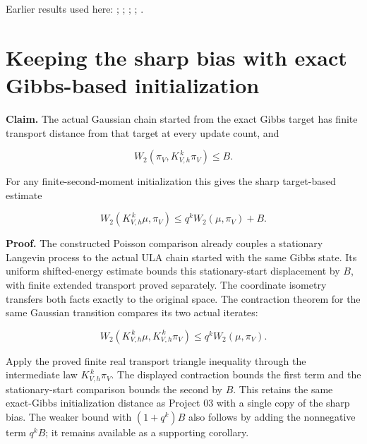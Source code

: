 \documentclass[11pt,a4paper]{article}
\begin{document}
Earlier results used here: \cite[Section~3.17.3]{LangevinLean2026ULASC}; \cite[Section~3.21.2]{LangevinLean2026ULASC}; \cite[Section~3.26.3]{LangevinLean2026ULASC}; \cite[Section~3.36.7]{LangevinLean2026ULASC}; \cite[Section~3.45.6]{LangevinLean2026ULASC}.

\section{\texorpdfstring{Keeping the sharp bias with exact Gibbs-based initialization}{Keeping the sharp bias with exact Gibbs-based initialization}}


\textbf{Claim.} The actual Gaussian chain started from the exact Gibbs target has finite transport distance from that target at every update count, and

\[W_2(\pi_V,K_{V,h}^{\,k}\pi_V)\le B.\]


For any finite-second-moment initialization this gives the sharp target-based estimate

\[W_2(K_{V,h}^{\,k}\mu,\pi_V)\le q^kW_2(\mu,\pi_V)+B.\]


\textbf{Proof.} The constructed Poisson comparison already couples a stationary Langevin process to the actual ULA chain started with the same Gibbs state. Its uniform shifted-energy estimate bounds this stationary-start displacement by \(B\), with finite extended transport proved separately. The coordinate isometry transfers both facts exactly to the original space. The contraction theorem for the same Gaussian transition compares its two actual iterates:

\[W_2(K_{V,h}^{\,k}\mu,K_{V,h}^{\,k}\pi_V)\le q^kW_2(\mu,\pi_V).\]


Apply the proved finite real transport triangle inequality through the intermediate law \(K_{V,h}^{\,k}\pi_V\). The displayed contraction bounds the first term and the stationary-start comparison bounds the second by \(B\). This retains the same exact-Gibbs initialization distance as Project 03 with a single copy of the sharp bias. The weaker bound with \((1+q^k)B\) also follows by adding the nonnegative term \(q^kB\); it remains available as a supporting corollary.
\end{document}
